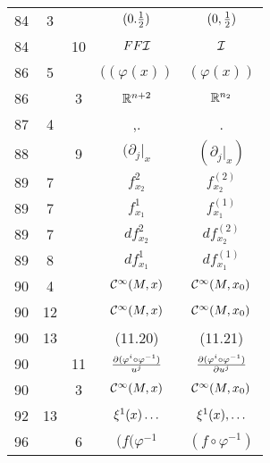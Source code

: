 \documentclass[a4paper,11pt]{article}
\begin{document}
\begin{center}
\begin{tabular}{|c|c|c|c|c|}
    84  &  3 & & $( 0. \frac{ 1 }{ 2 } )$ & $( 0, \frac{ 1 }{ 2 } )$ \\
    84  & & 10 & $FF\mathcal{I}$ & $\mathcal{I}$ \\
    86  &  5 & & $( ( \varphi( x ) )$ & $( \varphi( x ) )$ \\
    86  & &  3 & $\mathbb{R}^{ n + 2 }$ & $\mathbb{R}^{ n_{ 2 } }$ \\
    87  &  4 & & ,. & . \\
    88  & &  9 & $( \partial_{ j }|_{ x }$ & $( \partial_{ j }|_{ x } )$ \\
    89  &  7 & & $f_{ x_{ 2 } }^{ 2 }$ & $f_{ x_{ 2 } }^{ ( 2 ) }$ \\
    89  &  7 & & $f_{ x_{ 1 } }^{ 1 }$ & $f_{ x_{ 1 } }^{ ( 1 ) }$ \\
    89  &  7 & & $d f_{ x_{ 2 } }^{ 2 }$ & $d f_{ x_{ 2 } }^{ ( 2 ) }$ \\
    89  &  8 & & $d f_{ x_{ 1 } }^{ 1 }$ & $d f_{ x_{ 1 } }^{ ( 1 ) }$ \\
    90  &  4 & & $\mathcal{C}^{ \infty }( M, x )$ & $\mathcal{C}^{ \infty }( M, x_{ 0 } )$ \\
    90  & 12 & & $\mathcal{C}^{ \infty }( M, x )$
           & $\mathcal{C}^{ \infty }( M, x_{ 0 } )$ \\
    90  & 13 & & (11.20) & (11.21) \\
    90  & & 11 & $\frac{ \partial ( \varphi^{ i } \circ \varphi^{ -1 } ) }{ u^{ j } }$
           & $\frac{ \partial ( \varphi^{ i } \circ \varphi^{ -1 } ) }{ \partial u^{ j } }$ \\
    90  & &  3 & $\mathcal{C}^{ \infty }( M, x )$
           & $\mathcal{C}^{ \infty }( M, x_{ 0 } )$ \\
    92  & 13 & & $\xi^{ 1 }(x) \ldots$ & $\xi^{ 1 }(x), \ldots$ \\
    96  & &  6 & $( f ( \varphi^{ -1 }$ & $( f \circ \varphi^{ -1 } )$ \\
    \hline
  \end{tabular}


\end{center}
\end{document}
